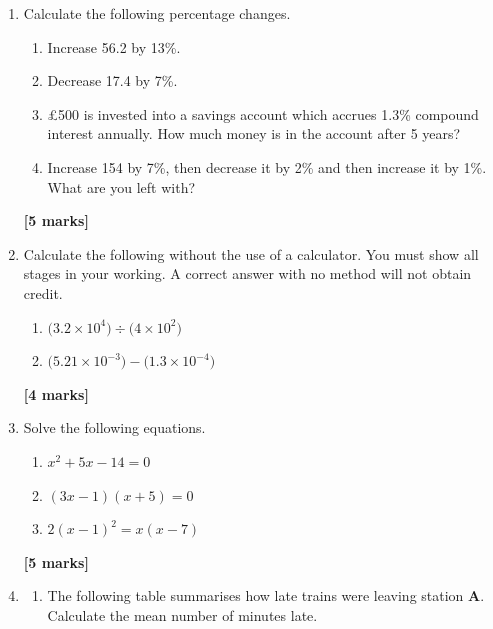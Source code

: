 \documentclass[12pt]{article}
\begin{document}
\begin{enumerate}
    \newpage

    \item Calculate the following percentage changes.
    \begin{enumerate}
        \item Increase 56.2 by 13\%. \vspace{4cm}
        \item Decrease 17.4 by 7\%. \vspace{4cm}
        \item £500 is invested into a savings account which accrues 1.3\% compound interest annually. How much money is in the account after 5  years? \vspace{6cm}
        \item Increase 154 by 7\%, then decrease it by 2\% and then increase it by 1\%. What are you left with?
    \end{enumerate}
    \vfill \hfill \textbf{[5 marks]}

    \newpage

    \item Calculate the following without the use of a calculator. You must show all stages in your working. A correct answer with no method will not obtain credit.
    \begin{enumerate}
        \item \(\big(3.2 \times 10^4\big) \div \big(4\times 10^2 \big) \) \vspace{6cm}
        \item \(\big(5.21 \times 10^{-3} \big) - \big( 1.3 \times 10^{-4} \big) \) \vspace{6cm}
    \end{enumerate}
    \vfill \hfill \textbf{[4 marks]}

    \newpage

    \item Solve the following equations.
    \begin{enumerate}
        \item \(x^2+5x-14=0\) \vspace{6cm}
        \item \((3x-1)(x+5)=0\)\vspace{6cm}
        \item \(2(x-1)^2=x(x-7)\)        
    \end{enumerate}
    \vfill \hfill \textbf{[5 marks]}

    \newpage

    \item
    \begin{enumerate}
        \item The following table summarises how late trains were leaving station \textbf{A}. Calculate the mean number of minutes late.


\end{enumerate}
\end{enumerate}
\end{document}
